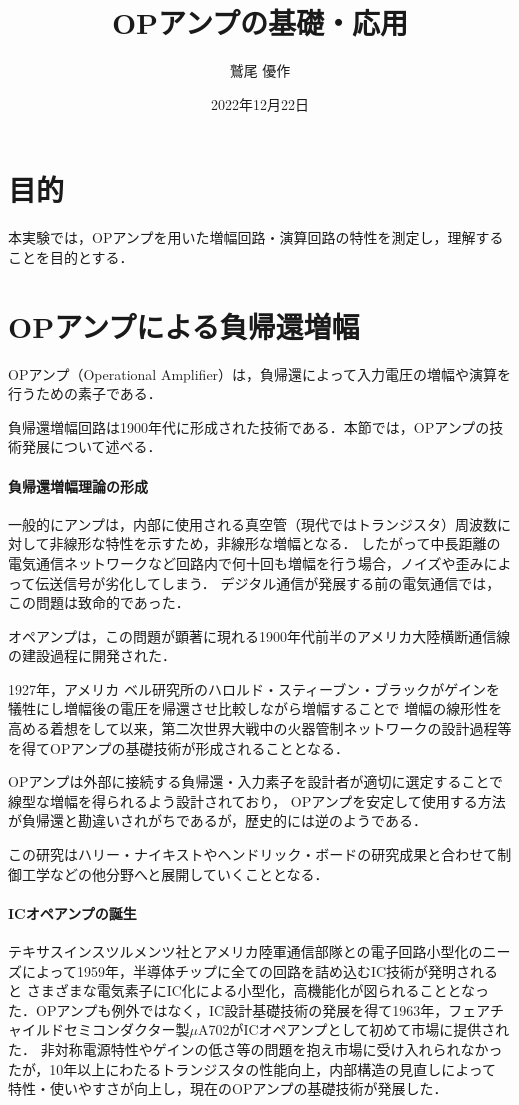 \documentclass[dvipdfmx,titlepage,a4j]{jsarticle}  %
\title{OPアンプの基礎・応用}
\author{鷲尾 優作}
\date{2022年12月22日}
\begin{document}
\pagestyle{foot}

\maketitle

\section{目的}
本実験では，OPアンプを用いた増幅回路・演算回路の特性を測定し，理解することを目的とする．

\section{OPアンプによる負帰還増幅}
OPアンプ（Operational Amplifier）は，負帰還によって入力電圧の増幅や演算を行うための素子である．

負帰還増幅回路は1900年代に形成された技術である．本節では，OPアンプの技術発展について述べる．

\paragraph{負帰還増幅理論の形成\\}
一般的にアンプは，内部に使用される真空管（現代ではトランジスタ）周波数に対して非線形な特性を示すため，非線形な増幅となる．
したがって中長距離の電気通信ネットワークなど回路内で何十回も増幅を行う場合，ノイズや歪みによって伝送信号が劣化してしまう．
デジタル通信が発展する前の電気通信では，この問題は致命的であった．

オペアンプは，この問題が顕著に現れる1900年代前半のアメリカ大陸横断通信線の建設過程に開発された．

1927年，アメリカ ベル研究所のハロルド・スティーブン・ブラックがゲインを犠牲にし増幅後の電圧を帰還させ比較しながら増幅することで
増幅の線形性を高める着想をして以来，第二次世界大戦中の火器管制ネットワークの設計過程等を得てOPアンプの基礎技術が形成されることとなる．

OPアンプは外部に接続する負帰還・入力素子を設計者が適切に選定することで線型な増幅を得られるよう設計されており，
OPアンプを安定して使用する方法が負帰還と勘違いされがちであるが，歴史的には逆のようである．

この研究はハリー・ナイキストやヘンドリック・ボードの研究成果と合わせて制御工学などの他分野へと展開していくこととなる．

\paragraph{ICオペアンプの誕生\\}
テキサスインスツルメンツ社とアメリカ陸軍通信部隊との電子回路小型化のニーズによって1959年，半導体チップに全ての回路を詰め込むIC技術が発明されると
さまざまな電気素子にIC化による小型化，高機能化が図られることとなった．OPアンプも例外ではなく，IC設計基礎技術の発展を得て1963年，フェアチャイルドセミコンダクター製$\mu$A702がICオペアンプとして初めて市場に提供された．
非対称電源特性やゲインの低さ等の問題を抱え市場に受け入れられなかったが，10年以上にわたるトランジスタの性能向上，内部構造の見直しによって
特性・使いやすさが向上し，現在のOPアンプの基礎技術が発展した．
\end{document}
